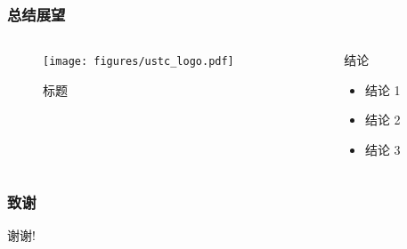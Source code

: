 \documentclass[aspectratio=169]{ctexbeamer}
\begin{document}
\begin{frame}
  \frametitle{总结展望}
  \begin{columns}
    \begin{column}{0.50\textwidth}
      \begin{figure}
        \texttt{[image: figures/ustc\_logo.pdf]}
        \caption{标题}
      \end{figure}
    \end{column}
    \begin{column}{0.50\textwidth}
      \begin{block}{结论}
        \begin{itemize}
          \item 结论 1
          \item 结论 2
          \item 结论 3
        \end{itemize}
      \end{block}
    \end{column}
  \end{columns}
\end{frame}

\begin{frame}
  \frametitle{致谢}
  \centerline{\Large 谢谢!}
\end{frame}
\end{document}
